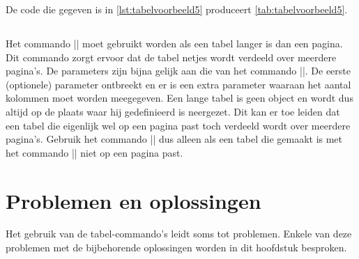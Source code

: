 \begin{llstShortInline}
	De code die gegeven is in \cref{lst:tabelvoorbeeld5} produceert \cref{tab:tabelvoorbeeld5}.
	
	
		
	\subsection{\texorpdfstring{\lcode{\\langetabelXm}}{\textbackslash{}langetabelXm}}
	Het commando |\langetabelXm| moet gebruikt worden als een tabel langer is dan een pagina.
	Dit commando zorgt ervoor dat de tabel netjes wordt verdeeld over meerdere pagina's.
	De parameters zijn bijna gelijk aan die van het commando |\tabelXm|.
	De eerste (optionele) parameter ontbreekt en er is een extra parameter waaraan het aantal kolommen moet worden meegegeven.
	Een lange tabel is geen  object en wordt dus altijd op de plaats waar hij gedefinieerd is neergezet.
	Dit kan er toe leiden dat een tabel die eigenlijk wel op een pagina past toch verdeeld wordt over meerdere pagina's.
	Gebruik het commando |\langetabelXm| dus alleen als een tabel die gemaakt is met het commando |\tabelXm| niet op een pagina past.

	\clearpage	
	\section{Problemen en oplossingen}
	Het gebruik van de tabel-commando's leidt soms tot problemen.
	Enkele van deze problemen met de bijbehorende oplossingen worden in dit hoofdstuk besproken.
\end{llstShortInline}	

